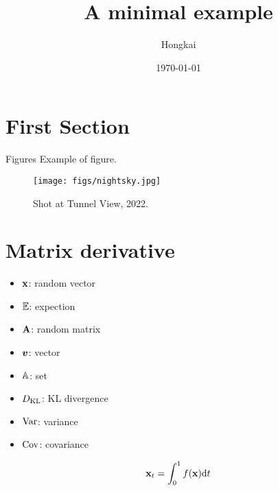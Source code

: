 \documentclass{beamer}
\title{A minimal example}
\date{\today}
\author{Hongkai}
\institute{Blue planet in the Milky Way}
\begin{document}
  \maketitle
  \section{First Section}
  \begin{frame}{Figures}
    Example of figure. 
    \begin{figure}
      \centering
      \texttt{[image: figs/nightsky.jpg]}
      \caption{Shot at Tunnel View, 2022.}
    \end{figure}
  \end{frame}
  \section{Matrix derivative}
  \begin{frame}
    \begin{itemize}
      \item ${\mathbf{x}}$: random vector
      \item $\mathbb{E}$: expection
      \item ${\mathbf{A}}$: random matrix
      \item ${\bm{v}}$: vector
      \item ${\mathbb{A}}$: set 
      \item $D_{\mathrm{KL}}$: KL divergence
      \item $\mathrm{Var}$: variance
      \item $\mathrm{Cov}$: covariance
    \end{itemize}
    \begin{equation}
      {\mathbf{x}}_t = \int_{0}^{1} f({\mathbf{x}}) \mathrm{d} t
    \end{equation}
  \end{frame}
\end{document}
